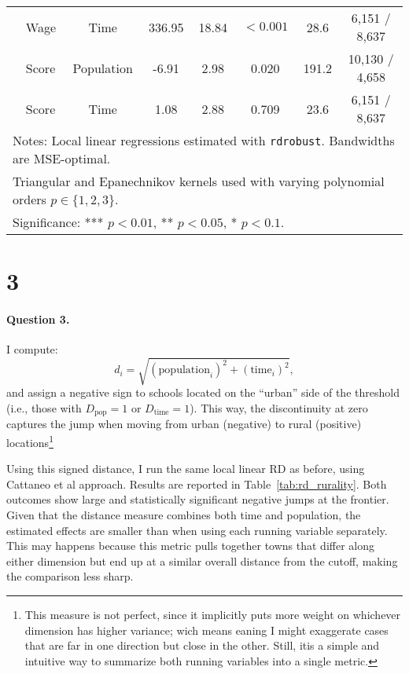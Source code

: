 \documentclass{article}
\begin{document}
\begin{table}[H]
\begin{tabular}{llcccccc}
                           & Wage & Time       & 336.95  & 18.84 & $<0.001$ & 28.6  & 6,151 / 8,637 \\
                           & Score & Population & -6.91  & 2.98 & 0.020 & 191.2 & 10,130 / 4,658 \\
                           & Score & Time       & 1.08   & 2.88 & 0.709 & 23.6 & 6,151 / 8,637 \\
\hline
\multicolumn{8}{l}{\footnotesize Notes: Local linear regressions estimated with \texttt{rdrobust}. Bandwidths are MSE-optimal.}\\
\multicolumn{8}{l}{\footnotesize Triangular and Epanechnikov kernels used with varying polynomial orders $p \in \{1,2,3\}$.}\\
\multicolumn{8}{l}{\footnotesize Significance: *** $p<0.01$, ** $p<0.05$, * $p<0.1$.}\\
\end{tabular}
\end{table}



\section{3}
\paragraph{Question 3.}

I compute:
\[
d_i = \sqrt{(\text{population}_i)^2 + (\text{time}_i)^2},
\]
and assign a negative sign to schools located on the ``urban'' side of the threshold (i.e., those with $D_{\text{pop}}=1$ or $D_{\text{time}}=1$). This way, the discontinuity at zero captures the jump when moving from urban (negative) to rural (positive) locations\footnote{This measure is not perfect, since it implicitly puts more weight on whichever dimension has higher variance; wich means eaning I might exaggerate cases that are far in one direction but close in the other. Still, itis a simple and intuitive way to summarize both running variables into a single metric.}

Using this signed distance, I run the same local linear RD as before, using Cattaneo et al approach. Results are reported in Table~\ref{tab:rd_rurality}. Both outcomes show large and statistically significant negative jumps at the frontier. Given that the distance measure combines both time and population, the estimated effects are smaller than when using each running variable separately. This may happens because this metric pulls together towns that differ along either dimension but end up at a similar overall distance from the cutoff, making the comparison less sharp.
\end{document}

